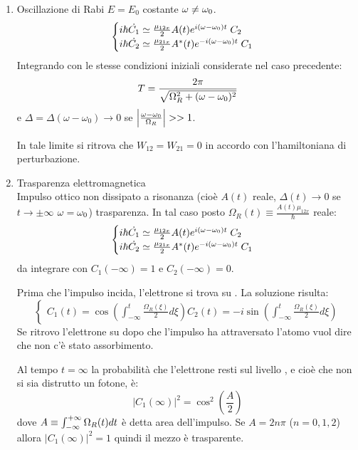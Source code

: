 \begin{enumerate}
    \item  Oscillazione di Rabi $E = E_0$ costante $\omega \neq \omega_0$.
    \begin{equation}
        \begin{cases}
            i\hbar \dot{C_1} \simeq  \frac{\mu_{12x}}{2}A(t) e^{i (\omega-\omega_0) t} \; C_2\\
            i\hbar \dot{C_2} \simeq  \frac{\mu_{21x}}{2} A^*(t)e^{-i (\omega-\omega_0) t} \; C_1
        \end{cases}
    \end{equation}
    Integrando con le stesse condizioni iniziali considerate nel caso precedente:
    \begin{equation}
        T = \frac{2\pi}{\sqrt{\Omega_R^2 + (\omega - \omega_0)^2}}
    \end{equation}
    e $\Delta = \Delta(\omega - \omega_0) \to 0$ se $\left|\frac{\omega - \omega_0}{\Omega_R}\right| >> 1$.
    
    In tale limite si ritrova che $W_{12} = W_{21} = 0$ in accordo con l'hamiltoniana di perturbazione.
    
    \item Trasparenza elettromagnetica\\
    Impulso ottico non dissipato a risonanza (cioè $A(t)$ reale, $\Delta(t) \to 0$ se $t \to \pm\infty$ $\omega=\omega_0$) \to trasparenza.
    In tal caso posto $\Omega_R(t) \equiv \frac{A(t) \mu_{12x}}{\hbar}$ reale:
    \begin{equation}
        \begin{cases}
            i\hbar \dot{C_1} \simeq  \frac{\mu_{12x}}{2}A(t) e^{i (\omega-\omega_0) t} \; C_2\\
            i\hbar \dot{C_2} \simeq  \frac{\mu_{21x}}{2} A^*(t)e^{-i (\omega-\omega_0) t} \; C_1
        \end{cases}
    \end{equation}
    da integrare con $C_1(-\infty) = 1$ e $C_2(-\infty) = 0$.
    
    Prima che l'impulso incida, l'elettrone si trova su .
    La soluzione risulta:
    \begin{equation}
        \begin{cases}
            C_1(t) = \cos\left(\int_{-\infty}^t \frac{\Omega_R(\xi)}{2} d\xi\right)
            C_2(t) = -i \sin\left(\int_{-\infty}^t \frac{\Omega_R(\xi)}{2} d\xi \right)
        \end{cases}
    \end{equation}
    Se ritrovo l'elettrone su  dopo che l'impulso ha attraversato l'atomo vuol dire che non c'è stato assorbimento.
    
    Al tempo $t = \infty$ la probabilità che l'elettrone resti sul livello , e cioè che non si sia distrutto un fotone, è:
    \begin{equation}
        |C_1(\infty)|^2 = \cos^2\left(\frac{A}{2}\right)
    \end{equation}
    dove $A \equiv \int_{-\infty}^{+\infty} \Omega_R(t) dt$ è detta area dell'impulso.
    Se $A=2n\pi$ ($n = 0,1,2$) allora $|C_1(\infty)|^2 = 1$ quindi il mezzo è trasparente.
\end{enumerate}


